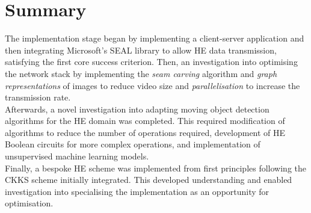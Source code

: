 \section{Summary}
\indent \indent
The implementation stage began by implementing a client-server application and then integrating Microsoft's SEAL library to allow HE data transmission, satisfying the first core success criterion. Then, an investigation into optimising the network stack by implementing the \textit{seam carving} algorithm and \textit{graph representations} of images to reduce video size and \textit{parallelisation} to increase the transmission rate.
\smallskip \\ \indent
Afterwards, a novel investigation into adapting moving object detection algorithms for the HE domain was completed. This required modification of algorithms to reduce the number of operations required, development of HE Boolean circuits for more complex operations, and implementation of unsupervised machine learning models.
\smallskip \\ \indent
Finally, a bespoke HE scheme was implemented from first principles following the CKKS scheme initially integrated. This developed understanding and enabled investigation into specialising the implementation as an opportunity for optimisation.


